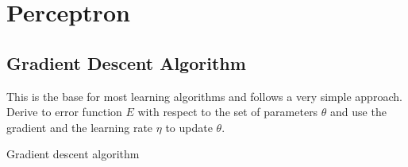 \chapter{Perceptron}\label{chapter:perceptron}

\section{Gradient Descent Algorithm}
This is the base for most learning algorithms and follows a very simple
approach. Derive to error function $E$ with respect to the set of parameters
$\theta$ and use the gradient and the learning rate $\eta$ to update $\theta$.

\begin{algorithm}[H]
\caption{Gradient descent algorithm}
\end{algorithm}